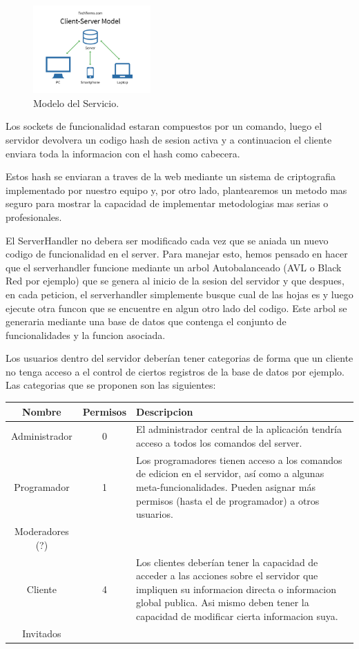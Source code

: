 \documentclass{article}
\theoremstyle{definition}
\begin{document}
\begin{figure}
\centering
\includegraphics[width=0.4\textwidth]{pics/serverclient.png}
\caption{Modelo del Servicio.}
\end{figure} 

Los sockets de funcionalidad estaran compuestos por un comando, luego el servidor devolvera un codigo hash de sesion activa y a continuacion el cliente enviara toda la informacion con el hash como cabecera.

Estos hash se enviaran a traves de la web mediante un sistema de criptografia implementado por nuestro equipo y, por otro lado, plantearemos un metodo mas seguro para mostrar la capacidad de implementar metodologias mas serias o profesionales.

El ServerHandler no debera ser modificado cada vez que se aniada un nuevo codigo de funcionalidad en el server. Para manejar esto, hemos pensado en hacer que el serverhandler funcione mediante un arbol Autobalanceado (AVL o Black Red por ejemplo) que se genera al inicio de la sesion del servidor y que despues, en cada peticion, el serverhandler simplemente busque cual de las hojas es y luego ejecute otra funcon que se encuentre en algun otro lado del codigo. Este arbol se generaria mediante una base de datos que contenga el conjunto de funcionalidades y la funcion asociada.


Los usuarios dentro del servidor deberían tener categorias de forma que un cliente no tenga acceso a el control de ciertos registros de la base de datos por ejemplo. Las categorias que se proponen son las siguientes:
\begin{center}
\begin{tabular}{|c|c|p{9cm}|}
\hline Nombre & Permisos & Descripcion \\
\hline Administrador & 0 & El administrador central de la aplicación tendría acceso a todos los comandos del server. \\
Programador & 1 & Los programadores tienen acceso a los comandos de edicion en el servidor, así como a algunas meta-funcionalidades. Pueden asignar más permisos (hasta el de programador) a otros usuarios.\\
Moderadores (?) & & \\
Cliente & 4 & Los clientes deberían tener la capacidad de acceder a las acciones sobre el servidor que impliquen su informacion directa o informacion global publica. Asi mismo deben tener la capacidad de modificar cierta informacion suya. \\
Invitados && \\ \hline

\end{tabular}
\end{center}
\end{document}

